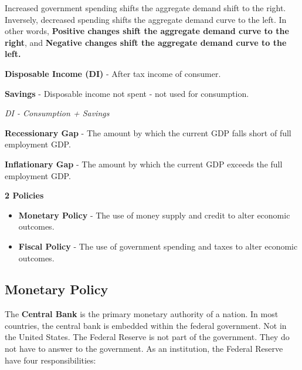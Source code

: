 \documentclass{article}
\begin{document}
    Increased government spending shifts the aggregate demand shift to the right. Inversely, decreased spending shifts the aggregate demand curve to the left. In other words, \textbf{Positive changes shift the aggregate demand curve to the right}, and \textbf{Negative changes shift the aggregate demand curve to the left.}
    
\textbf{Disposable Income (DI)} - After tax income of consumer.

\textbf{Savings} - Disposable income not spent - not used for consumption.

\textit{DI - Consumption + Savings}

\textbf{Recessionary Gap} - The amount by which the current GDP falls short of full employment GDP.

\textbf{Inflationary Gap} - The amount by which the current GDP exceeds the full employment GDP.

\textbf{2 Policies}
\begin{itemize}
    \item{\textbf{Monetary Policy} - The use of money supply and credit to alter economic outcomes.}
    \item{\textbf{Fiscal Policy} - The use of government spending and taxes to alter economic outcomes.}
\end{itemize}

\subsection{Monetary Policy}

The \textbf{Central Bank} is the primary monetary authority of a nation. In most countries, the central bank is embedded within the federal government. Not in the United States. The Federal Reserve is not part of the government. They do not have to answer to the government. As an institution, the Federal Reserve have four responsibilities:
\end{document}
